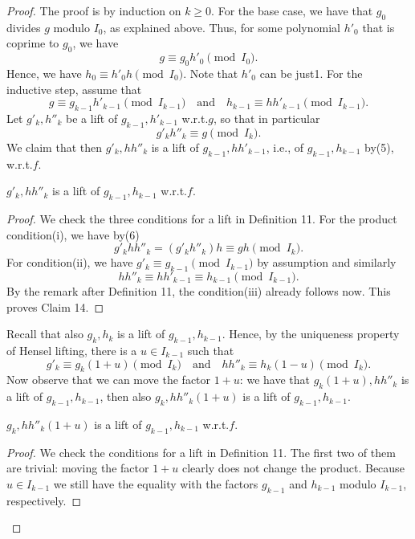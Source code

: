 \begin{proof}
The proof is by induction on $k\geq0$. For the base case, we have that $g_0$ divides $g$ modulo $I_0$, as explained above. Thus, for some polynomial $h'_0$ that is coprime to $g_0$, we have
\[g\equiv g_0h'_0\pmod{I_0}.\]
Hence, we have $h_0\equiv h'_0h\pmod{I_0}$. Note that $h'_0$ can be just1.
For the inductive step, assume that
\begin{equation}g\equiv g_{k-1}h'_{k-1}\pmod{I_{k-1}}\quad\text{and}\quad h_{k-1}\equiv hh'_{k-1}\pmod{I_{k-1}}.\tag{5}\end{equation}
Let $g'_k,h''_k$ be a lift of $g_{k-1},h'_{k-1}$ w.r.t.$g$, so that in particular
\begin{equation}g'_kh''_k\equiv g\pmod{I_k}.\tag{6}\end{equation}
We claim that then $g'_k,hh''_k$ is a lift of $g_{k-1},hh'_{k-1}$, i.e., of $g_{k-1},h_{k-1}$ by(5), w.r.t.$f$.
\begin{ntclaim}
$g'_k,hh''_k$ is a lift of $g_{k-1},h_{k-1}$ w.r.t.$f$.
\end{ntclaim}
\begin{proof}
We check the three conditions for a lift in Definition 11. For the product condition(i), we have by(6)
\[g'_khh''_k=(g'_kh''_k)h\equiv gh\pmod{I_k}.\]
For condition(ii), we have $g'_k\equiv g_{k-1}\pmod{I_{k-1}}$ by assumption and similarly
\[hh''_k\equiv hh'_{k-1}\equiv h_{k-1}\pmod{I_{k-1}}.\]
By the remark after Definition 11, the condition(iii) already follows now. This proves Claim 14.
\end{proof}
Recall that also $g_k,h_k$ is a lift of $g_{k-1},h_{k-1}$. Hence, by the uniqueness property of Hensel lifting, there is a $u\in I_{k-1}$ such that
\begin{equation}g'_k\equiv g_k(1+u)\pmod{I_k}\quad\text{and}\quad hh''_k\equiv h_k(1-u)\pmod{I_k}.\tag{7}\end{equation}
Now observe that we can move the factor $1+u$: we have that $g_k(1+u),hh''_k$ is a lift of $g_{k-1},h_{k-1}$, then also $g_k,hh''_k(1+u)$ is a lift of $g_{k-1},h_{k-1}$.
\begin{ntclaim}
$g_k,hh''_k(1+u)$ is a lift of $g_{k-1},h_{k-1}$ w.r.t.$f$.
\end{ntclaim}
\begin{proof}
We check the conditions for a lift in Definition 11. The first two of them are trivial: moving the factor $1+u$ clearly does not change the product. Because $u\in I_{k-1}$ we still have the equality with the factors $g_{k-1}$ and $h_{k-1}$ modulo $I_{k-1}$, respectively.

\end{proof}
\end{proof}
